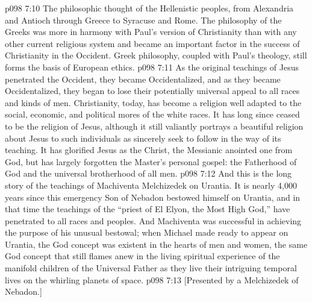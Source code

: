 \vs p098 7:10 \bibnobreakspace The philosophic thought of the Hellenistic peoples, from Alexandria and Antioch through Greece to Syracuse and Rome. The philosophy of the Greeks was more in harmony with Paul’s version of Christianity than with any other current religious system and became an important factor in the success of Christianity in the Occident. Greek philosophy, coupled with Paul’s theology, still forms the basis of European ethics.
\vs p098 7:11 \pc As the original teachings of Jesus penetrated the Occident, they became Occidentalized, and as they became Occidentalized, they began to lose their potentially universal appeal to all races and kinds of men. Christianity, today, has become a religion well adapted to the social, economic, and political mores of the white races. It has long since ceased to be the religion of Jesus, although it still valiantly portrays a beautiful religion about Jesus to such individuals as sincerely seek to follow in the way of its teaching. It has glorified Jesus as the Christ, the Messianic anointed one from God, but has largely forgotten the Master’s personal gospel: the Fatherhood of God and the universal brotherhood of all men.
\vs p098 7:12 \pc And this is the long story of the teachings of Machiventa Melchizedek on Urantia. It is nearly 4,000 years since this emergency Son of Nebadon bestowed himself on Urantia, and in that time the teachings of the “priest of El Elyon, the Most High God,” have penetrated to all races and peoples. And Machiventa was successful in achieving the purpose of his unusual bestowal; when Michael made ready to appear on Urantia, the God concept was existent in the hearts of men and women, the same God concept that still flames anew in the living spiritual experience of the manifold children of the Universal Father as they live their intriguing temporal lives on the whirling planets of space.
\vsetoff
\vs p098 7:13 [Presented by a Melchizedek of Nebadon.]
\quizlink
